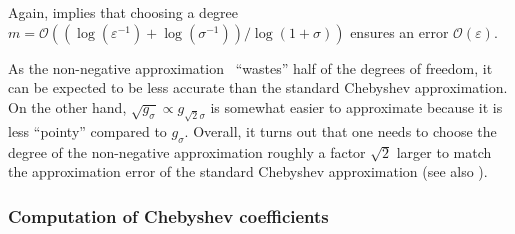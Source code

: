 Again,  implies that choosing a degree $m = \mathcal{O}((\log(\varepsilon^{-1}) + \log(\sigma^{-1})) / \log(1 + \sigma))$ ensures an error $\mathcal{O}(\varepsilon)$.

As the non-negative approximation~ ``wastes'' half of the degrees of freedom, it can be expected to be less accurate than the standard Chebyshev approximation. On the other hand, $\sqrt{g_{\sigma}} \propto g_{\sqrt{2}\sigma}$ is somewhat easier to approximate because it is less \enquote{pointy} compared to $g_{\sigma}$. Overall, it turns out that one needs to choose the degree of the non-negative approximation roughly a factor $\sqrt{2}$ larger to match the approximation error of the standard Chebyshev approximation (see also ).




\subsubsection{Computation of Chebyshev coefficients}
\label{subsubsec:dct}


